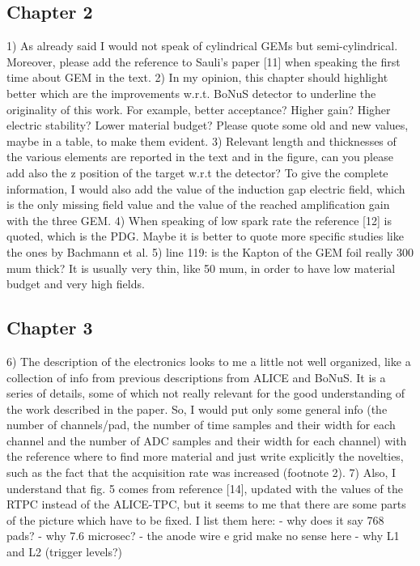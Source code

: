 \documentclass[a4paper,11pt,twoside]{article}
\begin{document}
\begin{enumerate}

\subsection*{Chapter 2}
1)	As already said I would not speak of cylindrical GEMs but semi-cylindrical. Moreover, please add the reference to Sauli's paper [11] when speaking the first time about GEM in the text.
2)	In my opinion, this chapter should highlight better which are the improvements w.r.t. BoNuS detector to underline the originality of this work. For example, better acceptance? Higher gain? Higher electric stability? Lower material budget? Please quote some old and new values, maybe in a table, to make them evident.
3)	Relevant length and thicknesses of the various elements are reported in the text and in the figure, can you please add also the z position of the target w.r.t the detector? To give the complete information, I would also add the value of the induction gap electric field, which is the only missing field value and the value of the reached amplification gain with the three GEM.
4)	When speaking of low spark rate the reference [12] is quoted, which is the PDG. Maybe it is better to quote more specific studies like the ones by Bachmann et al.
5)	line 119: is the Kapton of the GEM foil really 300 mum thick? It is usually very thin, like 50 mum, in order to have low material budget and very high fields.

\subsection*{ Chapter 3}
6)	The description of the electronics looks to me a little not well organized, like a collection of info from previous descriptions from ALICE and BoNuS. It is a series of details, some of which not really relevant for the good understanding of the work described in the paper. So, I would put only some general info (the number of channels/pad, the number of time samples and their width for each channel and the number of  ADC samples and their width for each channel) with the reference where to find more material and just write explicitly the novelties, such as the fact that the acquisition rate was increased (footnote 2).
7)	Also, I understand that fig. 5 comes from reference [14], updated with the values of the RTPC instead of the ALICE-TPC, but it seems to me that there are some parts of the picture which have to be fixed. I list them here:
- why does it say 768 pads?
- why 7.6 microsec?
- the anode wire e grid make no sense here
- why L1 and L2 (trigger levels?) 


\end{enumerate}
\end{document}
